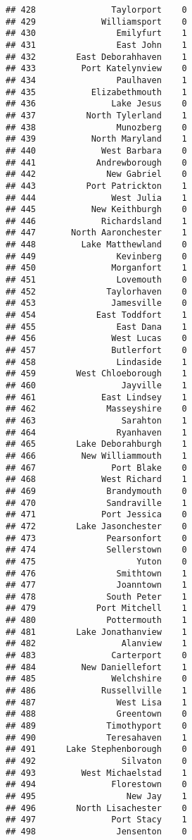 \documentclass[
]{article}
\begin{document}
\begin{verbatim}
## 428               Taylorport    0
## 429             Williamsport    0
## 430                Emilyfurt    1
## 431                East John    1
## 432        East Deborahhaven    1
## 433         Port Katelynview    0
## 434                Paulhaven    1
## 435           Elizabethmouth    1
## 436               Lake Jesus    0
## 437          North Tylerland    1
## 438                Munozberg    0
## 439           North Maryland    1
## 440             West Barbara    0
## 441            Andrewborough    0
## 442              New Gabriel    0
## 443          Port Patrickton    1
## 444               West Julia    1
## 445           New Keithburgh    0
## 446             Richardsland    1
## 447       North Aaronchester    1
## 448         Lake Matthewland    0
## 449                Kevinberg    0
## 450               Morganfort    1
## 451                Lovemouth    0
## 452              Taylorhaven    0
## 453               Jamesville    0
## 454            East Toddfort    1
## 455                East Dana    1
## 456               West Lucas    0
## 457               Butlerfort    0
## 458                Lindaside    1
## 459        West Chloeborough    1
## 460                 Jayville    1
## 461             East Lindsey    1
## 462              Masseyshire    0
## 463                 Sarahton    1
## 464                Ryanhaven    1
## 465        Lake Deborahburgh    1
## 466         New Williammouth    1
## 467               Port Blake    0
## 468             West Richard    1
## 469              Brandymouth    0
## 470              Sandraville    1
## 471             Port Jessica    0
## 472        Lake Jasonchester    0
## 473              Pearsonfort    0
## 474              Sellerstown    0
## 475                    Yuton    0
## 476                Smithtown    1
## 477                Joanntown    1
## 478              South Peter    1
## 479            Port Mitchell    1
## 480              Pottermouth    1
## 481        Lake Jonathanview    1
## 482                 Alanview    1
## 483               Carterport    0
## 484         New Daniellefort    1
## 485               Welchshire    0
## 486             Russellville    1
## 487                West Lisa    1
## 488                Greentown    0
## 489              Timothyport    0
## 490              Teresahaven    1
## 491      Lake Stephenborough    0
## 492                 Silvaton    0
## 493         West Michaelstad    1
## 494               Florestown    0
## 495                  New Jay    1
## 496        North Lisachester    0
## 497               Port Stacy    1
## 498                Jensenton    0

\end{verbatim}
\end{document}
